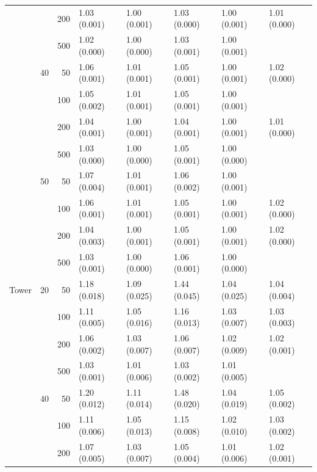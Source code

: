 \begin{longtable}{p{}lrlllll}
      &     & 200 &   1.03 (0.001) &   1.00 (0.001) &   1.03 (0.000) &         1.00 (0.001) &  1.01 (0.000) \\
      &     & 500 &   1.02 (0.000) &   1.00 (0.000) &   1.03 (0.001) &         1.00 (0.001) &            \\
      & 40  & 50  &   1.06 (0.001) &   1.01 (0.001) &   1.05 (0.001) &         1.00 (0.001) &  1.02 (0.000) \\
      &     & 100 &   1.05 (0.002) &   1.01 (0.001) &   1.05 (0.001) &         1.00 (0.001) &            \\
      &     & 200 &   1.04 (0.001) &   1.00 (0.001) &   1.04 (0.001) &         1.00 (0.001) &  1.01 (0.000) \\
      &     & 500 &   1.03 (0.000) &   1.00 (0.000) &   1.05 (0.001) &         1.00 (0.000) &            \\
      & 50  & 50  &   1.07 (0.004) &   1.01 (0.001) &   1.06 (0.002) &         1.00 (0.001) &            \\
      &     & 100 &   1.06 (0.001) &   1.01 (0.001) &   1.05 (0.001) &         1.00 (0.001) &  1.02 (0.000) \\
      &     & 200 &   1.04 (0.003) &   1.00 (0.001) &   1.05 (0.001) &         1.00 (0.001) &  1.02 (0.000) \\
      &     & 500 &   1.03 (0.001) &   1.00 (0.000) &   1.06 (0.001) &         1.00 (0.000) &            \\
\midrule
Tower & 20  & 50  &   1.18 (0.018) &   1.09 (0.025) &   1.44 (0.045) &         1.04 (0.025) &  1.04 (0.004) \\
      &     & 100 &   1.11 (0.005) &   1.05 (0.016) &   1.16 (0.013) &         1.03 (0.007) &  1.03 (0.003) \\
      &     & 200 &   1.06 (0.002) &   1.03 (0.007) &   1.06 (0.007) &         1.02 (0.009) &  1.02 (0.001) \\
      &     & 500 &   1.03 (0.001) &   1.01 (0.006) &   1.03 (0.002) &         1.01 (0.005) &            \\
      & 40  & 50  &   1.20 (0.012) &   1.11 (0.014) &   1.48 (0.020) &         1.04 (0.019) &  1.05 (0.002) \\
      &     & 100 &   1.11 (0.006) &   1.05 (0.013) &   1.15 (0.008) &         1.02 (0.010) &  1.03 (0.002) \\
      &     & 200 &   1.07 (0.005) &   1.03 (0.007) &   1.05 (0.004) &         1.01 (0.006) &  1.02 (0.001) \\

\end{longtable}

